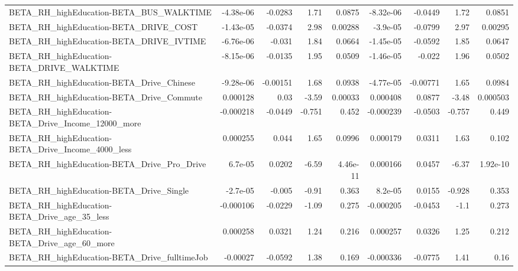 \begin{tabular}{lrrrrrrrr}
BETA\_RH\_highEducation-BETA\_BUS\_WALKTIME            &   -4.38e-06 &      -0.0283 &      1.71 &   0.0875 &  -8.32e-06 &     -0.0449 &         1.72 &        0.0851 \\
BETA\_RH\_highEducation-BETA\_DRIVE\_COST              &   -1.43e-05 &      -0.0374 &      2.98 &  0.00288 &   -3.9e-05 &     -0.0799 &         2.97 &       0.00295 \\
BETA\_RH\_highEducation-BETA\_DRIVE\_IVTIME            &   -6.76e-06 &       -0.031 &      1.84 &   0.0664 &  -1.45e-05 &     -0.0592 &         1.85 &        0.0647 \\
BETA\_RH\_highEducation-BETA\_DRIVE\_WALKTIME          &   -8.15e-06 &      -0.0135 &      1.95 &   0.0509 &  -1.46e-05 &      -0.022 &         1.96 &        0.0502 \\
BETA\_RH\_highEducation-BETA\_Drive\_Chinese           &   -9.28e-06 &     -0.00151 &      1.68 &   0.0938 &  -4.77e-05 &    -0.00771 &         1.65 &        0.0984 \\
BETA\_RH\_highEducation-BETA\_Drive\_Commute           &    0.000128 &         0.03 &     -3.59 &  0.00033 &   0.000408 &      0.0877 &        -3.48 &      0.000503 \\
BETA\_RH\_highEducation-BETA\_Drive\_Income\_12000\_more &   -0.000218 &      -0.0449 &    -0.751 &    0.452 &  -0.000239 &     -0.0503 &       -0.757 &         0.449 \\
BETA\_RH\_highEducation-BETA\_Drive\_Income\_4000\_less  &    0.000255 &        0.044 &      1.65 &   0.0996 &   0.000179 &      0.0311 &         1.63 &         0.102 \\
BETA\_RH\_highEducation-BETA\_Drive\_Pro\_Drive         &     6.7e-05 &       0.0202 &     -6.59 & 4.46e-11 &   0.000166 &      0.0457 &        -6.37 &      1.92e-10 \\
BETA\_RH\_highEducation-BETA\_Drive\_Single            &    -2.7e-05 &       -0.005 &     -0.91 &    0.363 &    8.2e-05 &      0.0155 &       -0.928 &         0.353 \\
BETA\_RH\_highEducation-BETA\_Drive\_age\_35\_less       &   -0.000106 &      -0.0229 &     -1.09 &    0.275 &  -0.000205 &     -0.0453 &         -1.1 &         0.273 \\
BETA\_RH\_highEducation-BETA\_Drive\_age\_60\_more       &    0.000258 &       0.0321 &      1.24 &    0.216 &   0.000257 &      0.0326 &         1.25 &         0.212 \\
BETA\_RH\_highEducation-BETA\_Drive\_fulltimeJob       &    -0.00027 &      -0.0592 &      1.38 &    0.169 &  -0.000336 &     -0.0775 &         1.41 &          0.16 \\

\end{tabular}
